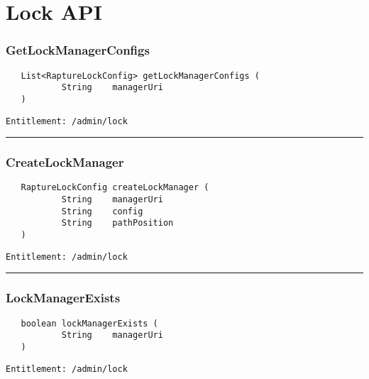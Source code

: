 \chapter{Lock API}

\subsection{GetLockManagerConfigs}
\label{Api:GetLockManagerConfigs}
\begin{verbatim}
   List<RaptureLockConfig> getLockManagerConfigs (
           String    managerUri
   )
\end{verbatim}
\begin{Verbatim}[fontsize=\small, formatcom=\color{Maroon}]
  Entitlement: /admin/lock
\end{Verbatim}



\rule{12cm}{2pt}
\subsection{CreateLockManager}
\label{Api:CreateLockManager}
\begin{verbatim}
   RaptureLockConfig createLockManager (
           String    managerUri
           String    config
           String    pathPosition
   )
\end{verbatim}
\begin{Verbatim}[fontsize=\small, formatcom=\color{Maroon}]
  Entitlement: /admin/lock
\end{Verbatim}



\rule{12cm}{2pt}
\subsection{LockManagerExists}
\label{Api:LockManagerExists}
\begin{verbatim}
   boolean lockManagerExists (
           String    managerUri
   )
\end{verbatim}
\begin{Verbatim}[fontsize=\small, formatcom=\color{Maroon}]
  Entitlement: /admin/lock
\end{Verbatim}



